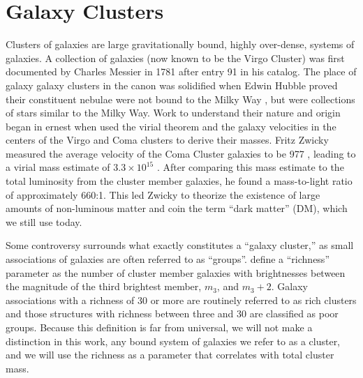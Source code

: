 \section{Galaxy Clusters}
Clusters of galaxies are large gravitationally bound, highly over-dense, systems of galaxies. A collection of galaxies (now known to be the Virgo Cluster) was first documented by Charles Messier in 1781 after entry 91 in his catalog. The place of galaxy galaxy clusters in the canon was solidified when Edwin Hubble proved their constituent nebulae were not bound to the Milky Way \citep{Hubble1926}, but were collections of stars similar to the Milky Way. Work to understand their nature and origin began in ernest when \cite{Hubble1931} used the virial theorem and the galaxy velocities in the centers of the Virgo \citep{Smith1936} and Coma \citep{Zwicky1933} clusters to derive their masses. Fritz Zwicky measured the average velocity of the Coma Cluster galaxies to be 977 \kms, leading to a virial mass estimate of $3.3 \times 10^{15}$ \Msol. After comparing this mass estimate to the total luminosity from the cluster member galaxies, he found a mass-to-light ratio of approximately 660:1. This led Zwicky to theorize the existence of large amounts of non-luminous matter and coin the term ``dark matter'' (DM), which we still use today.  

Some controversy surrounds what exactly constitutes a ``galaxy cluster,'' as small associations of galaxies are often referred to as ``groups''. \cite{Abell1958} define a ``richness'' parameter as the number of cluster member galaxies with brightnesses between the magnitude of the third brightest member, $m_3$, and $m_3 + 2$. Galaxy associations with a richness of 30 or more are routinely referred to as rich clusters and those structures with richness between three and 30 are classified as poor groups. Because this definition is far from universal, we will not make a distinction in this work, any bound system of galaxies we refer to as a cluster, and we will use the richness as a parameter that correlates with total cluster mass.

